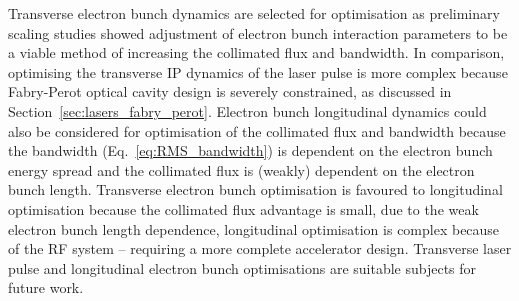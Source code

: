 \documentclass[../main.tex]{subfiles}
\begin{document}
Transverse electron bunch dynamics are selected for optimisation as preliminary scaling studies showed adjustment of electron bunch interaction parameters to be a viable method of increasing the collimated flux and bandwidth. In comparison, optimising the transverse IP dynamics of the laser pulse is more complex because Fabry-Perot optical cavity design is severely constrained, as discussed in Section~\ref{sec:lasers_fabry_perot}. Electron bunch longitudinal dynamics could also be considered for optimisation of the collimated flux and bandwidth because the bandwidth (Eq.~\ref{eq:RMS_bandwidth}) is dependent on the electron bunch energy spread and the collimated flux is (weakly) dependent on the electron bunch length. Transverse electron bunch optimisation is favoured to longitudinal optimisation because the collimated flux advantage is small, due to the weak electron bunch length dependence, longitudinal optimisation is complex because of the RF system -- requiring a more complete accelerator design. Transverse laser pulse and longitudinal electron bunch optimisations are suitable subjects for future work.  

   
\end{document}
